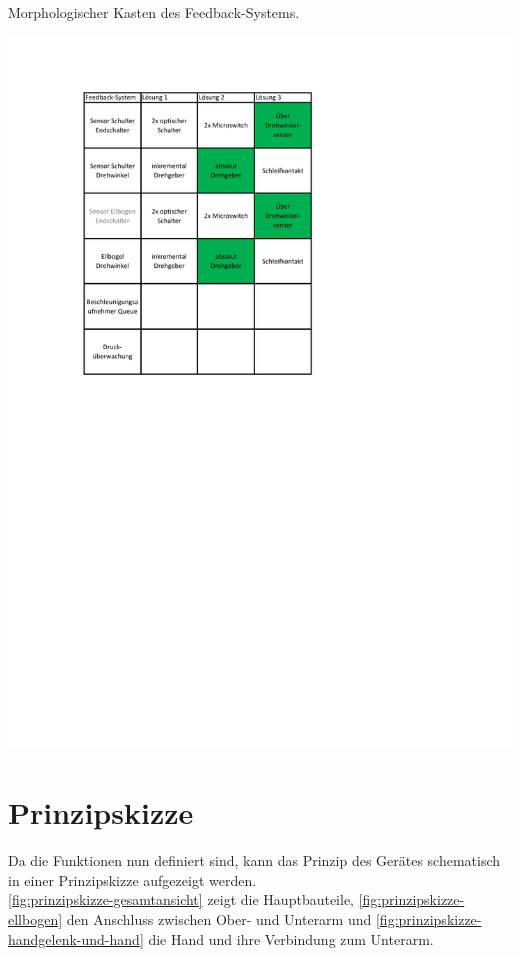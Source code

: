 	\begin{table}[h]
		\caption[Morphologischer Kasten des Feedback-Systems]{Morphologischer Kasten des Feedback-Systems.}
		\centering
		\includegraphics[width=\textwidth]{Abb/Morphologischer_Kasten_Feedback-System}
		\label{fig:morphologische-kasten-feedback-system}
	\end{table}

\section{Prinzipskizze}
	Da die Funktionen nun definiert sind, kann das Prinzip des Gerätes schematisch in einer Prinzipskizze aufgezeigt werden.\\
	\cref{fig:prinzipskizze-gesamtansicht} zeigt die Hauptbauteile, \cref{fig:prinzipskizze-ellbogen} den Anschluss zwischen Ober- und Unterarm und \cref{fig:prinzipskizze-handgelenk-und-hand} die Hand und ihre Verbindung zum Unterarm.

